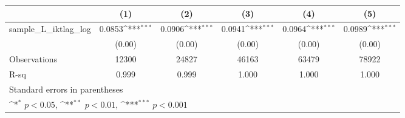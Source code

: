 {
\def\sym#1{\ifmmode^{#1}\else\(^{#1}\)\fi}
\begin{tabular}{l*{5}{c}}
\hline\hline
          &\multicolumn{1}{c}{(1)}         &\multicolumn{1}{c}{(2)}         &\multicolumn{1}{c}{(3)}         &\multicolumn{1}{c}{(4)}         &\multicolumn{1}{c}{(5)}         \\
\hline
sample\_L\_iktlag\_log&   0.0853\sym{***}&   0.0906\sym{***}&   0.0941\sym{***}&   0.0964\sym{***}&   0.0989\sym{***}\\
          &   (0.00)         &   (0.00)         &   (0.00)         &   (0.00)         &   (0.00)         \\
\hline
Observations&    12300         &    24827         &    46163         &    63479         &    78922         \\
R-sq      &    0.999         &    0.999         &    1.000         &    1.000         &    1.000         \\
\hline\hline
\multicolumn{6}{l}{\footnotesize Standard errors in parentheses}\\
\multicolumn{6}{l}{\footnotesize \sym{*} \(p<0.05\), \sym{**} \(p<0.01\), \sym{***} \(p<0.001\)}\\
\end{tabular}
}
